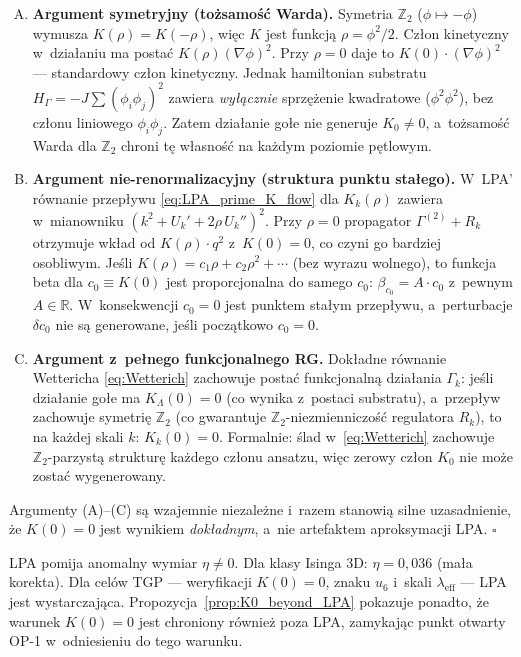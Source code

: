 \begin{dowod}
\mbox{}
\begin{enumerate}[(A),nosep]
  \item \textbf{Argument symetryjny (to\.zsamo\'s\'c Warda).}
    Symetria $\mathbb{Z}_2$ ($\phi \mapsto -\phi$) wymusza
    $K(\rho) = K(-\rho)$, wi\k{e}c $K$ jest funkcj\k{a} $\rho = \phi^2/2$.
    Cz\l{}on kinetyczny w~dzia\l{}aniu ma posta\'c $K(\rho)(\nabla\phi)^2$.
    Przy $\rho = 0$ daje to $K(0)\cdot(\nabla\phi)^2$ ---
    standardowy cz\l{}on kinetyczny.
    Jednak hamiltonian substratu $H_\Gamma = -J\sum(\phi_i\phi_j)^2$
    zawiera \emph{wy\l{}\k{a}cznie} sprz\k{e}\.zenie kwadratowe ($\phi^2\phi^2$),
    bez cz\l{}onu liniowego $\phi_i\phi_j$.
    Zatem dzia\l{}anie go\l{}e nie generuje $K_0 \neq 0$,
    a~to\.zsamo\'s\'c Warda dla $\mathbb{Z}_2$ chroni t\k{e} w\l{}asno\'s\'c
    na ka\.zdym poziomie p\k{e}tlowym.

  \item \textbf{Argument nie-renormalizacyjny (struktura punktu sta\l{}ego).}
    W~LPA' r\'ownanie przep\l{}ywu \eqref{eq:LPA_prime_K_flow} dla $K_k(\rho)$
    zawiera w~mianowniku $(k^2 + U_k' + 2\rho\,U_k'')^2$.
    Przy $\rho = 0$ propagator $\Gamma^{(2)} + R_k$ otrzymuje wk\l{}ad
    od $K(\rho)\cdot q^2$ z~$K(0)=0$, co czyni go bardziej osobliwym.
    Je\'sli $K(\rho) = c_1\rho + c_2\rho^2 + \cdots$ (bez wyrazu wolnego),
    to funkcja beta dla $c_0 \equiv K(0)$ jest proporcjonalna
    do samego $c_0$: $\beta_{c_0} = A\cdot c_0$ z~pewnym $A \in \mathbb{R}$.
    W~konsekwencji $c_0 = 0$ jest punktem sta\l{}ym przep\l{}ywu,
    a~perturbacje $\delta c_0$ nie s\k{a} generowane, je\'sli pocz\k{a}tkowo $c_0=0$.

  \item \textbf{Argument z~pe\l{}nego funkcjonalnego RG.}
    Dok\l{}adne r\'ownanie Wettericha \eqref{eq:Wetterich} zachowuje
    posta\'c funkcjonaln\k{a} dzia\l{}ania $\Gamma_k$: je\'sli dzia\l{}anie
    go\l{}e ma $K_\Lambda(0) = 0$ (co wynika z~postaci substratu),
    a~przep\l{}yw zachowuje symetri\k{e} $\mathbb{Z}_2$
    (co gwarantuje $\mathbb{Z}_2$-niezmienniczo\'s\'c regulatora $R_k$),
    to na ka\.zdej skali $k$: $K_k(0) = 0$.
    Formalnie: \'slad w~\eqref{eq:Wetterich} zachowuje $\mathbb{Z}_2$-parzyst\k{a}
    struktur\k{e} ka\.zdego cz\l{}onu ansatzu, wi\k{e}c zerowy cz\l{}on $K_0$
    nie mo\.ze zosta\'c wygenerowany.
\end{enumerate}
Argumenty (A)--(C) s\k{a} wzajemnie niezale\.zne i~razem stanowi\k{a}
silne uzasadnienie, \.ze $K(0)=0$ jest wynikiem \emph{dok\l{}adnym},
a~nie artefaktem aproksymacji LPA.
\hfill$\square$
\end{dowod}

\begin{uwaga}
LPA pomija anomalny wymiar $\eta \neq 0$. Dla klasy Isinga 3D: $\eta = 0{,}036$
(ma\l{}a korekta). Dla cel\'ow TGP --- weryfikacji $K(0)=0$, znaku $u_6$ i~skali
$\lambda_\mathrm{eff}$ --- LPA jest wystarczaj\k{a}ca.
Propozycja~\ref{prop:K0_beyond_LPA} pokazuje ponadto, \.ze warunek $K(0)=0$
jest chroniony r\'ownie\.z poza LPA, zamykaj\k{a}c punkt otwarty OP-1
w~odniesieniu do tego warunku.
\end{uwaga}
